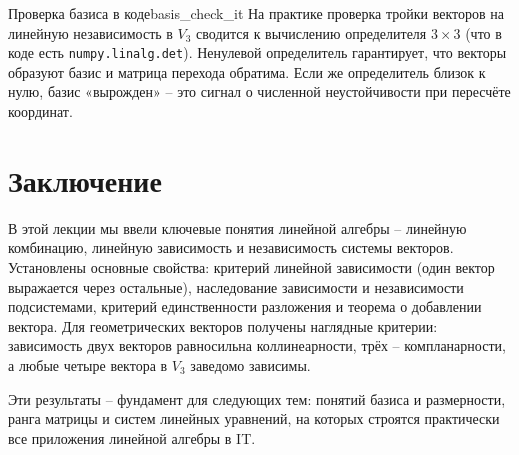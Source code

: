 \documentclass[12pt,a4paper]{article}
\begin{document}
\begin{remarkIT}{Проверка базиса в коде}{basis_check_it}
На практике проверка тройки векторов на линейную независимость в $V_3$
сводится к вычислению определителя $3\times 3$ (что в коде есть
\texttt{numpy.linalg.det}). Ненулевой определитель гарантирует, что
векторы образуют базис и матрица перехода обратима. Если же
определитель близок к нулю, базис «вырожден» -- это сигнал о численной
неустойчивости при пересчёте координат.
\end{remarkIT}

\section*{Заключение}

В этой лекции мы ввели ключевые понятия линейной алгебры -- линейную
комбинацию, линейную зависимость и независимость системы векторов.
Установлены основные свойства: критерий линейной зависимости (один вектор
выражается через остальные), наследование зависимости и независимости
подсистемами, критерий единственности разложения и теорема о добавлении
вектора. Для геометрических векторов получены наглядные критерии:
зависимость двух векторов равносильна коллинеарности, трёх --
компланарности, а любые четыре вектора в $V_3$ заведомо зависимы.

Эти результаты -- фундамент для следующих тем: понятий базиса и
размерности, ранга матрицы и систем линейных уравнений, на которых
строятся практически все приложения линейной алгебры в IT.
\end{document}
